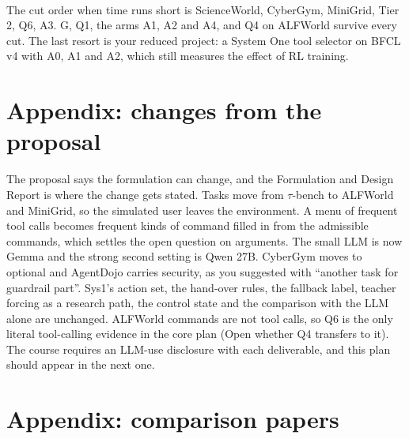 \documentclass[10pt]{article}
\newcommand{\my}{\textsuperscript{\textcolor{blue!70!black}{\dag}}}
\begin{document}
The cut order when time runs short\my{} is ScienceWorld, CyberGym, MiniGrid, Tier 2, Q6, A3. G, Q1, the arms A1, A2 and A4, and Q4 on ALFWorld survive every cut. The last resort is your reduced project: a System One tool selector on BFCL v4 with A0, A1 and A2, which still measures the effect of RL training.

\section*{Appendix: changes from the proposal}

The proposal says the formulation can change, and the Formulation and Design Report is where the change gets stated. Tasks move from $\tau$-bench to ALFWorld and MiniGrid, so the simulated user leaves the environment. A menu of frequent tool calls becomes frequent kinds of command filled in from the admissible commands, which settles the open question on arguments. The small LLM is now Gemma and the strong second setting is Qwen 27B. CyberGym moves to optional and AgentDojo carries security, as you suggested with ``another task for guardrail part''. Sys1's action set, the hand-over rules, the fallback label, teacher forcing as a research path, the control state and the comparison with the LLM alone are unchanged. ALFWorld commands are not tool calls, so Q6 is the only literal tool-calling evidence in the core plan (Open whether Q4 transfers to it). The course requires an LLM-use disclosure with each deliverable, and this plan should appear in the next one.

\section*{Appendix: comparison papers}
\end{document}
